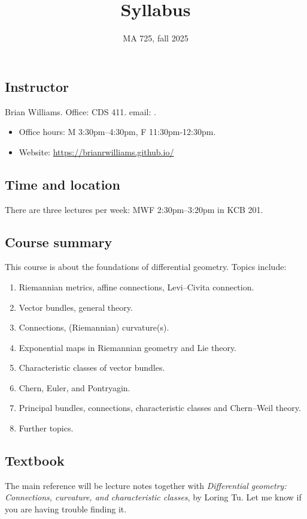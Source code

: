 \documentclass[../main.tex]{subfiles}
\title{\vspace{-0.5cm} Syllabus}
\author{MA 725, fall 2025}
\begin{document}
\maketitle

\subsection*{Instructor} Brian Williams. Office: CDS 411. email: .
\begin{itemize}
  \item Office hours: M 3:30pm--4:30pm, F 11:30pm-12:30pm.
  \item Website: \url{https://brianrwilliams.github.io/}
  \end{itemize}

  \subsection*{Time and location} 
  There are three lectures per week: MWF 2:30pm--3:20pm in KCB 201.

      \subsection*{Course summary}
      This course is about the foundations of differential geometry.
      Topics include:
\begin{enumerate}
  \item Riemannian metrics, affine connections, Levi--Civita connection.
  \item Vector bundles, general theory.
  \item Connections, (Riemannian) curvature(s).
  \item Exponential maps in Riemannian geometry and Lie theory.
  \item Characteristic classes of vector bundles.
  \item Chern, Euler, and Pontryagin.
  \item Principal bundles, connections, characteristic classes and Chern--Weil theory.
  \item Further topics.
\end{enumerate}

\subsection*{Textbook}

The main reference will be lecture notes together with \textit{Differential geometry: Connections, curvature, and
characteristic classes}, by Loring Tu.
Let me know if you are having trouble finding it.
\end{document}
